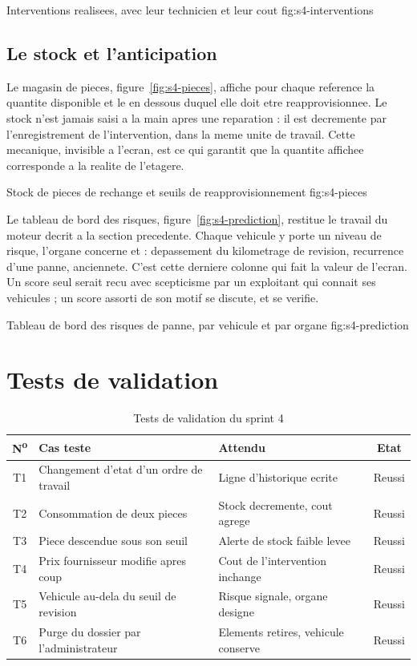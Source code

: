   {Interventions realisees, avec leur technicien et leur cout}
  {fig:s4-interventions}

\subsection{Le stock et l'anticipation}

Le magasin de pieces, figure~\ref{fig:s4-pieces}, affiche pour chaque
reference la quantite disponible et le  en
dessous duquel elle doit etre reapprovisionnee. Le stock n'est jamais
saisi a la main apres une reparation : il est decremente par
l'enregistrement de l'intervention, dans la meme unite de travail. Cette
mecanique, invisible a l'ecran, est ce qui garantit que la quantite
affichee corresponde a la realite de l'etagere.

  {Stock de pieces de rechange et seuils de reapprovisionnement}
  {fig:s4-pieces}

Le tableau de bord des risques, figure~\ref{fig:s4-prediction}, restitue
le travail du moteur decrit a la section precedente. Chaque vehicule y
porte un niveau de risque, l'organe concerne et  : depassement du kilometrage de revision, recurrence d'une
panne, anciennete. C'est cette derniere colonne qui fait la valeur de
l'ecran. Un score seul serait recu avec scepticisme par un exploitant qui
connait ses vehicules ; un score assorti de son motif se discute, et se
verifie.

  {Tableau de bord des risques de panne, par vehicule et par organe}
  {fig:s4-prediction}

\section{Tests de validation}

\begin{table}[H]
\centering
\caption{Tests de validation du sprint 4}
\label{tab:tests-s4}
\small
\begin{tabularx}{\textwidth}{@{}cXp{2.9cm}c@{}}
\toprule
\textbf{N\textsuperscript{o}} & \textbf{Cas teste} & \textbf{Attendu} &
\textbf{Etat} \\ \midrule
T1 & Changement d'etat d'un ordre de travail & Ligne d'historique ecrite & Reussi \\
T2 & Consommation de deux pieces & Stock decremente, cout agrege & Reussi \\
T3 & Piece descendue sous son seuil & Alerte de stock faible levee & Reussi \\
T4 & Prix fournisseur modifie apres coup & Cout de l'intervention inchange & Reussi \\
T5 & Vehicule au-dela du seuil de revision & Risque signale, organe designe & Reussi \\
T6 & Purge du dossier par l'administrateur & Elements retires, vehicule conserve & Reussi \\
\bottomrule
\end{tabularx}
\end{table}

